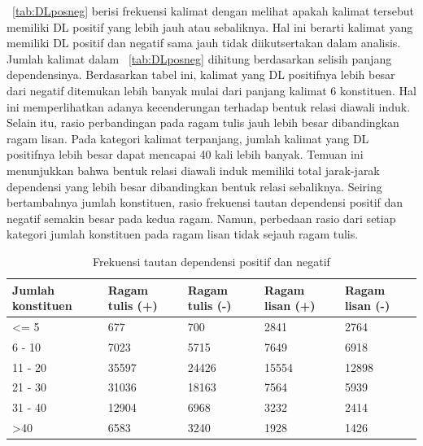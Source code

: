 \tab~\ref{tab:DLposneg} berisi frekuensi kalimat dengan melihat apakah kalimat tersebut memiliki DL positif yang lebih jauh atau sebaliknya. Hal ini berarti kalimat yang memiliki DL positif dan negatif sama jauh tidak diikutsertakan dalam analisis. Jumlah kalimat dalam \tab~\ref{tab:DLposneg} dihitung berdasarkan selisih panjang dependensinya. Berdasarkan tabel ini, kalimat yang DL positifnya lebih besar dari negatif ditemukan lebih banyak mulai dari panjang kalimat 6 konstituen. Hal ini memperlihatkan adanya kecenderungan terhadap bentuk relasi diawali induk. Selain itu, rasio perbandingan pada ragam tulis jauh lebih besar dibandingkan ragam lisan. Pada kategori kalimat terpanjang, jumlah kalimat yang DL positifnya lebih besar dapat mencapai 40 kali lebih banyak.  Temuan ini menunjukkan bahwa bentuk relasi diawali induk memiliki total jarak-jarak dependensi yang lebih besar dibandingkan bentuk relasi sebaliknya. Seiring bertambahnya jumlah konstituen, rasio frekuensi tautan dependensi positif dan negatif semakin besar pada kedua ragam. Namun, perbedaan rasio dari setiap kategori jumlah konstituen pada ragam lisan tidak sejauh ragam tulis. 

\begin{table}
\begin{center}
\begin{small}
\caption{Frekuensi tautan dependensi positif dan negatif}  \label{tab:tautanposneg}
\begin{tabular}{ | p{2cm} | p{2cm} | p{2cm} | p{2cm} | p{2cm} |}
    \hline
Jumlah konstituen & Ragam tulis (+) & Ragam tulis (-) & Ragam lisan (+) & Ragam lisan (-) \\ \hline
\textless= 5 & 677 & 700 & 2841 & 2764 \\ \hline
6 - 10 & 7023 & 5715 & 7649 & 6918 \\ \hline
11 - 20 & 35597 & 24426 & 15554 & 12898 \\ \hline
21 - 30 & 31036 & 18163 & 7564 & 5939 \\ \hline
31 - 40 & 12904 & 6968 & 3232 & 2414 \\ \hline
\textgreater 40 & 6583 & 3240 & 1928 & 1426 \\ \hline
   \end{tabular}
   \end{small}
\end{center}
\end{table}

